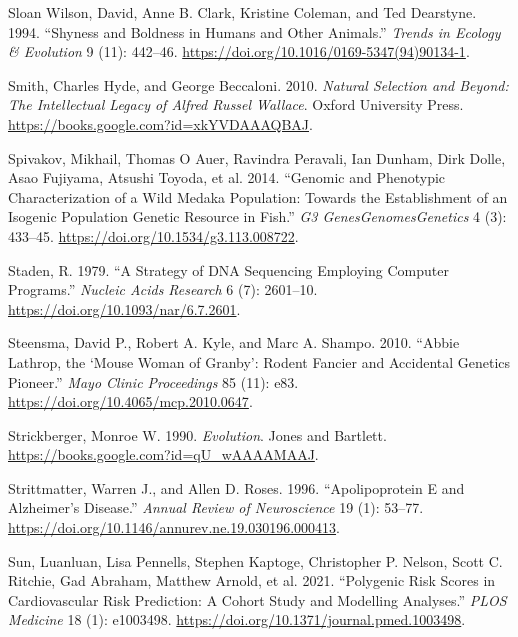 \documentclass[
]{book}
\newlength{\cslhangindent}
\newlength{\cslentryspacingunit} %
\newenvironment{CSLReferences}[2] %
 {%
  \setlength{\parindent}{0pt}
  \ifodd #1
  \let\oldpar\par
  \def\par{\hangindent=\cslhangindent\oldpar}
  \fi
  \setlength{\parskip}{#2\cslentryspacingunit}
 }%
 {}
\begin{document}
\begin{CSLReferences}{1}{0}
\leavevmode{}%
Sloan Wilson, David, Anne B. Clark, Kristine Coleman, and Ted Dearstyne. 1994. {``Shyness and Boldness in Humans and Other Animals.''} \emph{Trends in Ecology \& Evolution} 9 (11): 442--46. \url{https://doi.org/10.1016/0169-5347(94)90134-1}.

\leavevmode{}%
Smith, Charles Hyde, and George Beccaloni. 2010. \emph{Natural {Selection} and {Beyond}: {The Intellectual Legacy} of {Alfred Russel Wallace}}. {Oxford University Press}. \url{https://books.google.com?id=xkYVDAAAQBAJ}.

\leavevmode{}%
Spivakov, Mikhail, Thomas O Auer, Ravindra Peravali, Ian Dunham, Dirk Dolle, Asao Fujiyama, Atsushi Toyoda, et al. 2014. {``Genomic and {Phenotypic Characterization} of a {Wild Medaka Population}: {Towards} the {Establishment} of an {Isogenic Population Genetic Resource} in {Fish}.''} \emph{G3 Genes\textbar Genomes\textbar Genetics} 4 (3): 433--45. \url{https://doi.org/10.1534/g3.113.008722}.

\leavevmode{}%
Staden, R. 1979. {``A Strategy of {DNA} Sequencing Employing Computer Programs.''} \emph{Nucleic Acids Research} 6 (7): 2601--10. \url{https://doi.org/10.1093/nar/6.7.2601}.

\leavevmode{}%
Steensma, David P., Robert A. Kyle, and Marc A. Shampo. 2010. {``Abbie {Lathrop}, the {`{Mouse Woman} of {Granby}'}: {Rodent Fancier} and {Accidental Genetics Pioneer}.''} \emph{Mayo Clinic Proceedings} 85 (11): e83. \url{https://doi.org/10.4065/mcp.2010.0647}.

\leavevmode{}%
Strickberger, Monroe W. 1990. \emph{Evolution}. {Jones and Bartlett}. \url{https://books.google.com?id=qU_wAAAAMAAJ}.

\leavevmode{}%
Strittmatter, Warren J., and Allen D. Roses. 1996. {``Apolipoprotein {E} and {Alzheimer}'s {Disease}.''} \emph{Annual Review of Neuroscience} 19 (1): 53--77. \url{https://doi.org/10.1146/annurev.ne.19.030196.000413}.

\leavevmode{}%
Sun, Luanluan, Lisa Pennells, Stephen Kaptoge, Christopher P. Nelson, Scott C. Ritchie, Gad Abraham, Matthew Arnold, et al. 2021. {``Polygenic Risk Scores in Cardiovascular Risk Prediction: {A} Cohort Study and Modelling Analyses.''} \emph{PLOS Medicine} 18 (1): e1003498. \url{https://doi.org/10.1371/journal.pmed.1003498}.


\end{CSLReferences}
\end{document}
